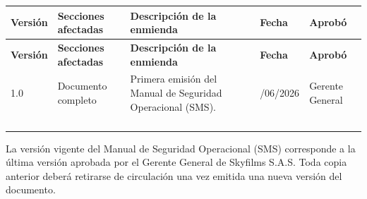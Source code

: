 \begin{longtable}{|>{\centering\arraybackslash}p{1.6cm}|p{3.0cm}|p{5.6cm}|>{\centering\arraybackslash}p{1.9cm}|p{2.3cm}|}

\hline

\rowcolor{gray!20}

\textbf{Versión} &
\textbf{Secciones afectadas} &
\textbf{Descripción de la enmienda} &
\textbf{Fecha} &
\textbf{Aprobó}

\\
\hline

\endfirsthead

\hline

\rowcolor{gray!20}

\textbf{Versión} &
\textbf{Secciones afectadas} &
\textbf{Descripción de la enmienda} &
\textbf{Fecha} &
\textbf{Aprobó}

\\
\hline

\endhead

1.0 &
Documento completo &
Primera emisión del Manual de Seguridad Operacional (SMS). &
23/06/2026 &
Gerente General

\\
\hline

&
&
&
&
\\
\hline

&
&
&
&
\\
\hline

&
&
&
&
\\
\hline

&
&
&
&
\\
\hline

\end{longtable}

\vspace{0.4cm}

\begin{tcolorbox}[
colback=gray!5,
colframe=black,
title=Control Documental]

La versión vigente del Manual de Seguridad Operacional (SMS) corresponde a la última versión aprobada por el Gerente General de Skyfilms S.A.S. Toda copia anterior deberá retirarse de circulación una vez emitida una nueva versión del documento.

\end{tcolorbox}